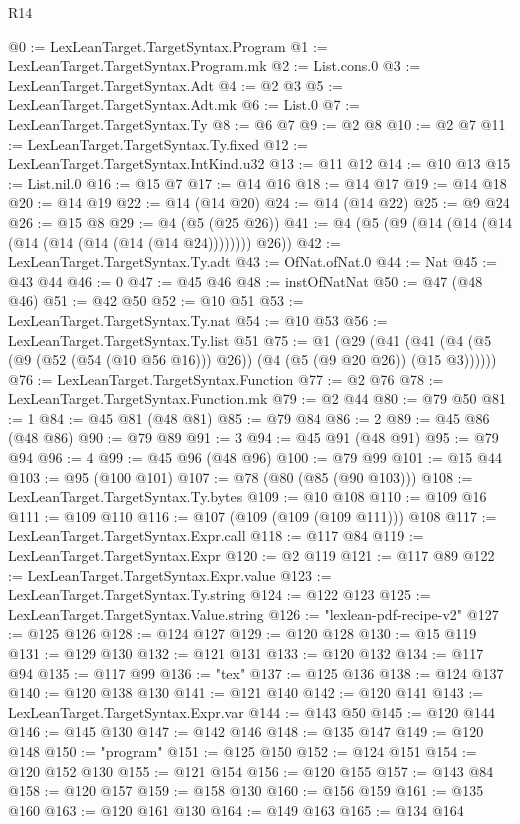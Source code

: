 \begin{lexlean}{R14}
\begin{coremodule}
{{{{{{{{{{{{{{{{{{{{{{{{{{{{{{{{{{{{{{{{{{{{{{{{{{{{{{{{{{{{{{{{{{{{{{{{{{{{{{{{{{{{{{{{{{{{{{{{{{{{{{{{{{@0 := LexLeanTarget.TargetSyntax.Program
@1 := LexLeanTarget.TargetSyntax.Program.mk
@2 := List.cons.{0}
@3 := LexLeanTarget.TargetSyntax.Adt
@4 := @2 @3
@5 := LexLeanTarget.TargetSyntax.Adt.mk
@6 := List.{0}
@7 := LexLeanTarget.TargetSyntax.Ty
@8 := @6 @7
@9 := @2 @8
@10 := @2 @7
@11 := LexLeanTarget.TargetSyntax.Ty.fixed
@12 := LexLeanTarget.TargetSyntax.IntKind.u32
@13 := @11 @12
@14 := @10 @13
@15 := List.nil.{0}
@16 := @15 @7
@17 := @14 @16
@18 := @14 @17
@19 := @14 @18
@20 := @14 @19
@22 := @14 (@14 @20)
@24 := @14 (@14 @22)
@25 := @9 @24
@26 := @15 @8
@29 := @4 (@5 (@25 @26))
@41 := @4 (@5 (@9 (@14 (@14 (@14 (@14 (@14 (@14 (@14 (@14 @24)))))))) @26))
@42 := LexLeanTarget.TargetSyntax.Ty.adt
@43 := OfNat.ofNat.{0}
@44 := Nat
@45 := @43 @44
@46 := 0
@47 := @45 @46
@48 := instOfNatNat
@50 := @47 (@48 @46)
@51 := @42 @50
@52 := @10 @51
@53 := LexLeanTarget.TargetSyntax.Ty.nat
@54 := @10 @53
@56 := LexLeanTarget.TargetSyntax.Ty.list @51
@75 := @1
    (@29 (@41 (@41 (@4 (@5 (@9 (@52 (@54 (@10 @56 @16))) @26)) (@4 (@5 (@9 @20 @26)) (@15 @3))))))
@76 := LexLeanTarget.TargetSyntax.Function
@77 := @2 @76
@78 := LexLeanTarget.TargetSyntax.Function.mk
@79 := @2 @44
@80 := @79 @50
@81 := 1
@84 := @45 @81 (@48 @81)
@85 := @79 @84
@86 := 2
@89 := @45 @86 (@48 @86)
@90 := @79 @89
@91 := 3
@94 := @45 @91 (@48 @91)
@95 := @79 @94
@96 := 4
@99 := @45 @96 (@48 @96)
@100 := @79 @99
@101 := @15 @44
@103 := @95 (@100 @101)
@107 := @78 (@80 (@85 (@90 @103)))
@108 := LexLeanTarget.TargetSyntax.Ty.bytes
@109 := @10 @108
@110 := @109 @16
@111 := @109 @110
@116 := @107 (@109 (@109 (@109 @111))) @108
@117 := LexLeanTarget.TargetSyntax.Expr.call
@118 := @117 @84
@119 := LexLeanTarget.TargetSyntax.Expr
@120 := @2 @119
@121 := @117 @89
@122 := LexLeanTarget.TargetSyntax.Expr.value
@123 := LexLeanTarget.TargetSyntax.Ty.string
@124 := @122 @123
@125 := LexLeanTarget.TargetSyntax.Value.string
@126 := "lexlean-pdf-recipe-v2"
@127 := @125 @126
@128 := @124 @127
@129 := @120 @128
@130 := @15 @119
@131 := @129 @130
@132 := @121 @131
@133 := @120 @132
@134 := @117 @94
@135 := @117 @99
@136 := "tex"
@137 := @125 @136
@138 := @124 @137
@140 := @120 @138 @130
@141 := @121 @140
@142 := @120 @141
@143 := LexLeanTarget.TargetSyntax.Expr.var
@144 := @143 @50
@145 := @120 @144
@146 := @145 @130
@147 := @142 @146
@148 := @135 @147
@149 := @120 @148
@150 := "program"
@151 := @125 @150
@152 := @124 @151
@154 := @120 @152 @130
@155 := @121 @154
@156 := @120 @155
@157 := @143 @84
@158 := @120 @157
@159 := @158 @130
@160 := @156 @159
@161 := @135 @160
@163 := @120 @161 @130
@164 := @149 @163
@165 := @134 @164
}}}}}}}}}}}}}}}}}}}}}}}}}}}}}}}}}}}}}}}}}}}}}}}}}}}}}}}}}}}}}}}}}}}}}}}}}}}}}}}}}}}}}}}}}}}}}}}}}}}}}}}}}}
\end{coremodule}
\end{lexlean}
